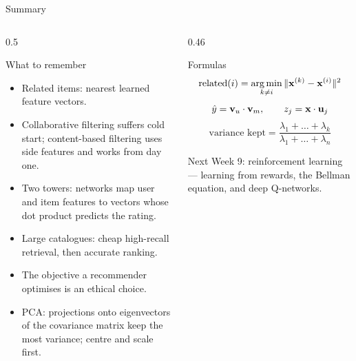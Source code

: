 \documentclass[aspectratio=169,10pt]{beamer}
\begin{document}
\begin{frame}{Summary}
  \begin{columns}[T,onlytextwidth]
    \begin{column}{0.5\textwidth}
      \begin{block}{What to remember}
        \footnotesize
        \begin{itemize}
          \item Related items: nearest learned feature vectors.
          \item Collaborative filtering suffers cold start; content-based filtering
                uses side features and works from day one.
          \item Two towers: networks map user and item features to vectors whose dot
                product predicts the rating.
          \item Large catalogues: cheap high-recall retrieval, then accurate ranking.
          \item The objective a recommender optimises is an ethical choice.
          \item PCA: projections onto eigenvectors of the covariance matrix keep the most
                variance; centre and scale first.
        \end{itemize}
      \end{block}
    \end{column}
    \begin{column}{0.46\textwidth}
      \begin{block}{Formulas}
        \[ \text{related}(i) = \operatorname*{arg\,min}_{k\ne i}\|\mathbf{x}^{(k)} - \mathbf{x}^{(i)}\|^2 \]
        \[ \hat y = \mathbf{v}_u\cdot\mathbf{v}_m, \qquad z_j = \mathbf{x}\cdot\mathbf{u}_j \]
        \[ \text{variance kept} = \frac{\lambda_1+\dots+\lambda_k}{\lambda_1+\dots+\lambda_n} \]
      \end{block}
      \begin{block}{Next}
        \footnotesize Week 9: reinforcement learning --- learning from rewards, the
        Bellman equation, and deep Q-networks.
      \end{block}
    \end{column}
  \end{columns}
\end{frame}
\end{document}
